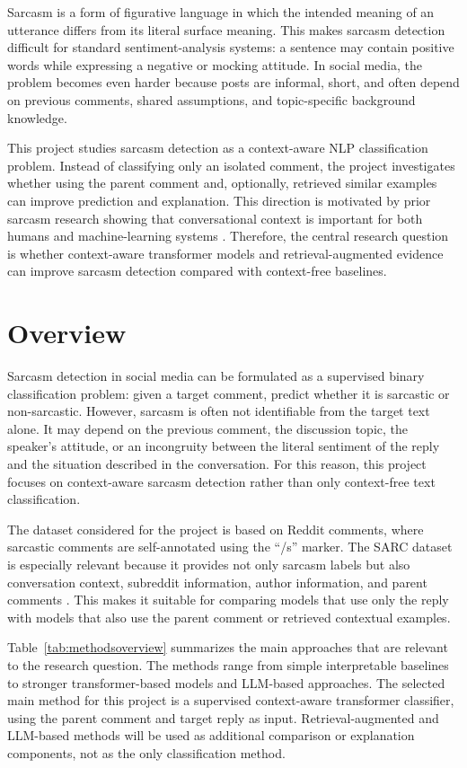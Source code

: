 \documentclass[%
 reprint,
 amsmath,amssymb,
 aps,
]{revtex4-2}
\begin{document}
Sarcasm is a form of figurative language in which the intended meaning of an utterance differs from its literal surface meaning. This makes sarcasm detection difficult for standard sentiment-analysis systems: a sentence may contain positive words while expressing a negative or mocking attitude. In social media, the problem becomes even harder because posts are informal, short, and often depend on previous comments, shared assumptions, and topic-specific background knowledge.

This project studies sarcasm detection as a context-aware NLP classification problem. Instead of classifying only an isolated comment, the project investigates whether using the parent comment and, optionally, retrieved similar examples can improve prediction and explanation. This direction is motivated by prior sarcasm research showing that conversational context is important for both humans and machine-learning systems \cite{khodak2018large}. Therefore, the central research question is whether context-aware transformer models and retrieval-augmented evidence can improve sarcasm detection compared with context-free baselines.


\section{\label{sec:overview}Overview} %

Sarcasm detection in social media can be formulated as a supervised binary classification problem: given a target comment, predict whether it is sarcastic or non-sarcastic. However, sarcasm is often not identifiable from the target text alone. It may depend on the previous comment, the discussion topic, the speaker's attitude, or an incongruity between the literal sentiment of the reply and the situation described in the conversation. For this reason, this project focuses on context-aware sarcasm detection rather than only context-free text classification.

The dataset considered for the project is based on Reddit comments, where sarcastic comments are self-annotated using the ``/s'' marker. The SARC dataset is especially relevant because it provides not only sarcasm labels but also conversation context, subreddit information, author information, and parent comments \cite{khodak2018large}. This makes it suitable for comparing models that use only the reply with models that also use the parent comment or retrieved contextual examples.

Table~\ref{tab:methodsoverview} summarizes the main approaches that are relevant to the research question. The methods range from simple interpretable baselines to stronger transformer-based models and LLM-based approaches. The selected main method for this project is a supervised context-aware transformer classifier, using the parent comment and target reply as input. Retrieval-augmented and LLM-based methods will be used as additional comparison or explanation components, not as the only classification method.
\end{document}
